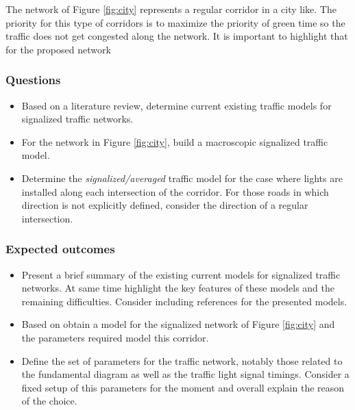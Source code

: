 \documentclass[]{book}
\providecommand{\tightlist}{%
  \setlength{\itemsep}{0pt}\setlength{\parskip}{0pt}}
\theoremstyle{definition}
\theoremstyle{definition}
\theoremstyle{definition}
\theoremstyle{remark}
\begin{document}
The network of Figure \ref{fig:city} represents a regular corridor in a
city like. The priority for this type of corridors is to maximize the
priority of green time so the traffic does not get congested along the
network. It is important to highlight that for the proposed network

\hypertarget{questions}{%
\subsubsection*{Questions}\label{questions}}

\begin{itemize}
\tightlist
\item
  Based on a literature review, determine current existing traffic
  models for signalized traffic networks.
\item
  For the network in Figure \ref{fig:city}, build a macroscopic
  signalized traffic model.
\item
  Determine the \emph{signalized/averaged} traffic model for the case
  where lights are installed along each intersection of the corridor.
  For those roads in which direction is not explicitly defined, consider
  the direction of a regular intersection.
\end{itemize}

\hypertarget{expected-outcomes}{%
\subsubsection*{Expected outcomes}\label{expected-outcomes}}

\begin{itemize}
\item
  Present a brief summary of the existing current models for signalized
  traffic networks. At same time highlight the key features of these
  models and the remaining difficulties. Consider including references
  for the presented models.
\item
  Based on \autocite{Grandinetti2015} obtain a model for the signalized
  network of Figure \ref{fig:city} and the parameters required model
  this corridor.
\item
  Define the set of parameters for the traffic network, notably those
  related to the fundamental diagram as well as the traffic light signal
  timings. Consider a fixed setup of this parameters for the moment and
  overall explain the reason of the choice.
\end{itemize}
\end{document}
